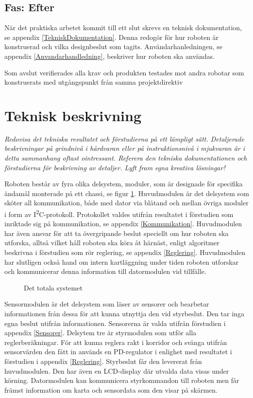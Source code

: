 \documentclass[11pt]{article}
\begin{document}
\begin{flushleft}
\subsection{Fas: Efter}
När det praktiska arbetet kommit till ett slut skrevs en teknisk dokumentation, se appendix \ref{TekniskDokumentation}. Denna redogör för hur roboten är konstruerad och vilka designbeslut som tagits. Användarhanledningen, se appendix \ref{Anvandarhandledning}, beskriver hur roboten ska användas.

Som avslut verifierades alla krav och produkten testades mot andra robotar som konstruerats med utgångspunkt från samma projektdirektiv

\pagebreak

\section{Teknisk beskrivning}
\textit{Redovisa det tekniska resultatet och förstudierna på ett lämpligt sätt. Detaljerade beskrivningar på grindnivå i hårdvaran eller på instruktionsnivå i mjukvaran är i detta sammanhang oftast ointressant. Referera den tekniska dokumentationen och förstudierna för beskrivning av detaljer. Lyft fram egna kreativa lösningar!}

Roboten består av fyra olika delsystem, moduler, som är designade för specifika ändamål monterade på ett chassi, se figur \ref{overview}. Huvudmodulen är det delsystem som sköter all kommunikation, både med dator via blåtand och mellan övriga moduler i form av I\textsuperscript{2}C-protokoll. Protokollet valdes utifrån resultatet i förstudien som inriktade sig på kommunikation, se appendix \ref{Kommunikation}. Huvudmodulen har även ansvar för att ta övergripande beslut speciellt om hur roboten ska utforska, alltså vilket håll roboten ska köra åt härnäst, enligt algoritmer beskrivna i förstudien som rör reglering, se appendix \ref{Reglering}. Huvudmodulen har slutligen också hand om intern kartläggning under tiden roboten utforskar och kommunicerar denna information till datormodulen vid tillfälle. 

\begin{figure}[!htbp]
\centering
\noindent\resizebox{.7\linewidth}{!}{
	}
	\caption{Det totala systemet \label{overview}}	
\end{figure}

Sensormodulen är det delsystem som läser av sensorer och bearbetar informationen från dessa för att kunna utnyttja den vid styrbeslut. Den tar inga egna beslut utifrån informationen. Sensorerna är valda utifrån förstudien i appendix \ref{Sensorer}. Delsytem tre är styrmodulen som utför alla reglerberäkningar. För att kunna reglera rakt i korridor och svänga utifrån sensorvärden den fått in används en PD-regulator i enlighet med resultatet i förstudien i appendix \ref{Reglering}. Styrbeslut får den levererat från huvudmodulen. Den har även en LCD-display där utvalda data visas under körning. Datormodulen kan kommunicera styrkommandon till roboten men får främst information om karta och sensordata som den visar på skärmen. 


\end{flushleft}
\end{document}
